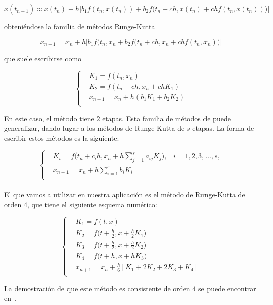\[x(t_{n+1}) \approx x(t_n) + h\Big[ b_1f(t_n,x(t_n)) + b_2f\Big(t_n+ch,x(t_n) +
		chf(t_n,x(t_n))\Big)\Big] \]

obteniéndose la familia de métodos Runge-Kutta

\[ x_{n+1} = x_n + h\Big[b_1f(t_n,x_n + b_2f\Big(t_n + ch, x_n +
chf(t_n,x_n)\Big)\Big] \]

que suele escribirse como

\[ \left\{ 
		\begin{aligned}
		& K_1 = f(t_n,x_n) \\
		& K_2 = f(t_n + ch, x_n + chK_1) \\
		& x_{n+1} = x_n + h(b_1K_1 + b_2K_2) \\
		\end{aligned}
	\right. \]

En este caso, el método tiene $2$ etapas. Esta familia de métodos de puede
generalizar, dando lugar a los métodos de Runge-Kutta de $s$ etapas. La
forma de escribir estos métodos es la siguiente:

\begin{equation}
	\left\{	
		\begin{aligned}
			& K_i = f\bigg(t_n + c_ih,x_n + h\sum_{j=1}^sa_{ij}K_j\bigg),
			\;\;\; i=1,2,3,\ldots,s, \\
			& x_{n+1} = x_n + h\sum_{i=1}^sb_iK_i \\
		\end{aligned}
		\right.
\end{equation}\\

El que vamos a utilizar en nuestra aplicación es el método de Runge-Kutta de
orden 4, que tiene el siguiente esquema numérico:

\begin{equation}
	\left\{	
		\begin{aligned}
			& K_1 = f(t,x) \\
			& K_2 = f\bigg(t+\frac{h}{2},x+\frac{h}{2}K_1\bigg) \\
			& K_3 = f\bigg(t+\frac{h}{2},x+\frac{h}{2}K_2\bigg) \\
			& K_4 = f\Big(t+h,x+hK_3\Big) \\
			& x_{n+1} = x_n + \frac{h}{6}[K_1 + 2K_2 + 2K_3 + K_4] \\
		\end{aligned}
	\right.
\end{equation}

La demostración de que este método es consistente de orden 4 se puede encontrar
en~\citet{ANNU}.

